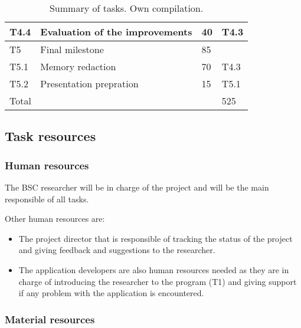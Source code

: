 \begin{table}[htbp]
\begin{tabular}{llll}
T4.4 & Evaluation of the improvements                   & 40       & T4.3         \\ \hline
T5   & Final milestone                                  & 85       &              \\ \hline
T5.1 & Memory redaction                                 & 70       & T4.3         \\
T5.2 & Presentation prepration                          & 15       & T5.1         \\ \hline
\multicolumn{3}{l}{Total}                                          & 525         
\end{tabular}
\caption[Summary of tasks]{Summary of tasks. Own compilation.}
\label{tab:tasks}
\end{table}

\subsection{Task resources}

\subsubsection{Human resources}

The BSC researcher will be in charge of the project and will be the main responsible of all tasks.

Other human resources are:
\begin{itemize}
  \item The project director that is responsible of tracking the status of the project and giving feedback and suggestions to the researcher.
  \item The application developers are also human resources needed as they are in charge of introducing the researcher to the program (T1) and giving support if any problem with the application is encountered.
\end{itemize}

\subsubsection{Material resources}

